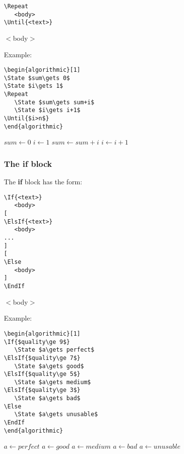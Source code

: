 \documentclass{article}
\newcommand\ASTART{\bigskip\noindent\begin{minipage}[b]{0.5\linewidth}}
\newcommand\ACONTINUE{\end{minipage}\begin{minipage}[b]{0.5\linewidth}}
\newcommand\AENDSKIP{\end{minipage}\bigskip}
\newcommand\AEND{\end{minipage}}
\begin{document}
\ASTART
\begin{verbatim}
\Repeat
   <body>
\Until{<text>}
\end{verbatim}
\ACONTINUE
\begin{algorithmic}[1]
\Repeat
   \State $<$body$>$
\end{algorithmic}
\AENDSKIP

\noindent Example:

\ASTART
\begin{verbatim}
\begin{algorithmic}[1]
\State $sum\gets 0$
\State $i\gets 1$
\Repeat
   \State $sum\gets sum+i$
   \State $i\gets i+1$
\Until{$i>n$}
\end{algorithmic}
\end{verbatim}
\ACONTINUE
\begin{algorithmic}[1]
\State $sum\gets 0$
\State $i\gets 1$
\Repeat
   \State $sum\gets sum+i$
   \State $i\gets i+1$
\Statex
\end{algorithmic}
\AEND

\subsubsection{The \textbf{if} block}
The \textbf{if} block has the form:

\ASTART
\begin{verbatim}
\If{<text>}
   <body>
[
\ElsIf{<text>}
   <body>
...
]
[
\Else
   <body>
]
\EndIf
\end{verbatim}
\ACONTINUE
\begin{algorithmic}[1]
   \State $<$body$>$
\EndIf
\end{algorithmic}
\AENDSKIP

\noindent Example:

\ASTART
\begin{verbatim}
\begin{algorithmic}[1]
\If{$quality\ge 9$}
   \State $a\gets perfect$
\ElsIf{$quality\ge 7$}
   \State $a\gets good$
\ElsIf{$quality\ge 5$}
   \State $a\gets medium$
\ElsIf{$quality\ge 3$}
   \State $a\gets bad$
\Else
   \State $a\gets unusable$
\EndIf
\end{algorithmic}
\end{verbatim}
\ACONTINUE
\begin{algorithmic}[1]
   \State $a\gets perfect$
   \State $a\gets good$
   \State $a\gets medium$
   \State $a\gets bad$
\Else
   \State $a\gets unusable$
\EndIf
\Statex
\end{algorithmic}
\AEND
\end{document}
